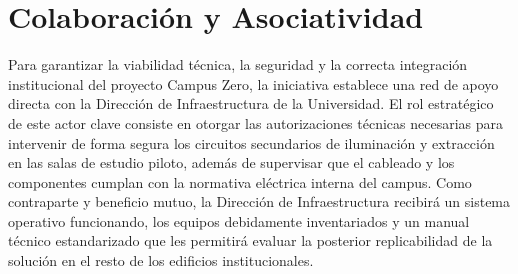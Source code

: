 
\section{Colaboración y Asociatividad}
\label{sec:asociatividad}

Para garantizar la viabilidad técnica, la seguridad y la correcta integración institucional del proyecto Campus Zero, la iniciativa establece una red de apoyo directa con la Dirección de Infraestructura de la Universidad. El rol estratégico de este actor clave consiste en otorgar las autorizaciones técnicas necesarias para intervenir de forma segura los circuitos secundarios de iluminación y extracción en las salas de estudio piloto, además de supervisar que el cableado y los componentes cumplan con la normativa eléctrica interna del campus. Como contraparte y beneficio mutuo, la Dirección de Infraestructura recibirá un sistema operativo funcionando, los equipos debidamente inventariados y un manual técnico estandarizado que les permitirá evaluar la posterior replicabilidad de la solución en el resto de los edificios institucionales.
